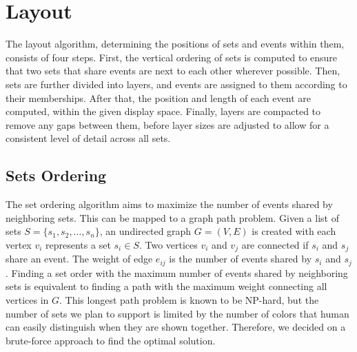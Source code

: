 \section{Layout}

The layout algorithm, determining the positions of sets and events within them,  consists of four steps. First, the vertical ordering of sets is computed to ensure that two sets that share events are next to each other wherever possible. Then, sets are further divided into layers, and events are assigned to them according to their memberships. After that, the position and length of each event are computed, within the given display space. Finally, layers are compacted to remove any gaps between them, before layer sizes are adjusted to allow for a consistent level of detail across all sets. 

\subsection{Sets Ordering}
\label{sec:set-ordering}
The set ordering algorithm aims to maximize the number of events shared by neighboring sets. This can be mapped to a graph path problem. Given a list of sets $S=\{s_1, s_2, \dotsc, s_n\}$, an undirected graph $G = (V,E)$ is created with each vertex $v_i$ represents a set $s_i \in S$. Two vertices $v_i$ and $v_j$ are connected if $s_i$ and $s_j$ share an event. The weight of edge $e_{ij}$ is the number of events shared by $s_i$ and $s_j$. Finding a set order with the maximum number of events shared by neighboring sets is equivalent to finding a path with the maximum weight connecting all vertices in $G$. This longest path problem is known to be NP-hard, but the number of sets we plan to support is limited by the number of colors that human can easily distinguish when they are shown together. Therefore, we decided on a brute-force approach to find the optimal solution.

